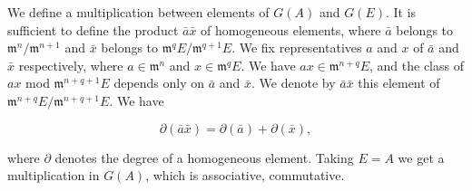 We define a multiplication between elements of $G(A)$ and $G(E)$. It is sufficient to define the product $\bar{a} \bar{x}$ of homogeneous elements, where $\bar{a}$ belongs to $\mathfrak{m}^n / \mathfrak{m}^{n+1}$ and $\bar{x}$ belongs to $\mathfrak{m}^q E / \mathfrak{m}^{q+1} E$. We fix representatives $a$ and $x$ of $\bar{a}$ and $\bar{x}$ respectively, where $a \in \mathfrak{m}^n$ and $x \in \mathfrak{m}^q E$. We have $ax \in \mathfrak{m}^{n+q} E$, and the class of $ax$ mod $\mathfrak{m}^{n+q+1} E$ depends only on $\bar{a}$ and $\bar{x}$. We denote by $\bar{a} \bar{x}$ this element of $\mathfrak{m}^{n+q} E / \mathfrak{m}^{n+q+1} E$. We have

$$\partial(\bar{a} \bar{x}) = \partial(\bar{a}) + \partial(\bar{x}),$$

where $\partial$ denotes the degree of a homogeneous element. Taking $E = A$ we get a multiplication in $G(A)$, which is associative, commutative.